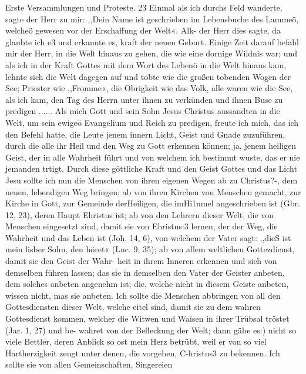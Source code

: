 Erste Versammlungen und Proteste. 23
Einmal als ich durchs Feld wanderte, sagte der Herr zu mir:
,,Dein Name ist geschrieben im Lebensbuche des Lammeö, welcheö
gewesen vor der Erschaffung der Welt«. Alk- der Herr dies sagte,
da glaubte ich e3 und erkannte es, kraft der neuen Geburt. Einige
Zeit darauf befahl mir der Herr, in die Welt hinaus zu gehen,
die wie eine dornige Wildnis war; und als ich in der Kraft
Gottes mit dem Wort des Lebenö in die Welt hinaus kam, lehnte
sich die Welt dagegen auf und tobte wie die großen tobenden
Wogen der See; Priester wie ,,Fromme«, die Obrigkeit wie das
Volk, alle waren wie die See, als ich kam, den Tag des Herrn 
unter ihnen zu verkünden und ihnen Buse zu predigen ......
Als mich Gott und sein Sohn Jesus Christus aussandten
in die Welt, um sein ewigeö Evangelium und Reich zu predigen,
freute ich mich, das ich den Befehl hatte, die Leute jenem innern
Licht, Geist und Gnade zuzuführen, durch die alle ihr Heil und
den Weg zu Gott erkennen können; ja, jenem heiligen Geist,
der in alle Wahrheit führt und von welchem ich bestimmt wuste,
das er nie jemanden trtigt.
Durch diese göttliche Kraft und den Geist Gottes und das
Licht Jesu sollte ich nun die Menschen von ihren eigenen Wegen
ab zu Christus?-, dem neuen, lebendigen Weg bringen; ab von
ihren Kirchen von Menschen gemacht, zur Kirche in Gott, zur
Gemeinde derHeiligen, die imHi1nmel angeschrieben ist (Gbr. 12, 23),
deren Haupt Ehristus ist; ab von den Lehrern dieser Welt, die
von Menschen eingesetzt sind, damit sie von Ehristus:3 lernen, der
der Weg, die Wahrheit und das Leben ist (Joh. 14, 6), von welchem
der Vater sagt: ,,dieS ist mein lisber Sohn, den höret« (Luc. 9, 35);
ab von allem weltlichen Gottezdienst, damit sie den Geist der Wahr-
heit in ihrem Inneren erkennen und sich von demselben führen
lassen; das sie in demselben den Vater der Geister anbeten, dem
solches anbeten angenehm ist; die, welche nicht in diesem Geiste
anbeten, wissen nicht, mas sie anbeten. Ich sollte die Menschen
abbringen von all den Gottesdiensten dieser Welt, welche eitel
sind, damit sie zu dem wahren Gottesdienst kommen, welcher die
Witwen und Waisen in ihrer Trübsal tröstet (Jar. 1, 27) und be-
wahret von der Befleckung der Welt; dann gäbe es:) nicht so viele
Bettler, deren Anblick so ost mein Herz betrübt, weil er von so
viel Hartherzigkeit zeugt unter denen, die vorgeben, C-hristus3 zu
bekennen. Ich sollte sie von allen Gemeinschaften, Singereien


